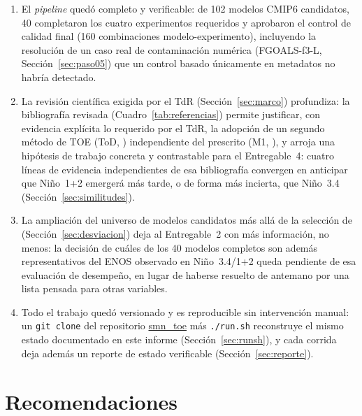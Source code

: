 \documentclass[11pt,a4paper]{article}
\newcommand{\archivo}[1]{\begingroup\hypersetup{urlcolor=black}\url{#1}\endgroup}
\begin{document}
\begin{enumerate}[label=(\roman*)]

\item El \emph{pipeline} qued\'o completo y verificable: de 102 modelos CMIP6 candidatos, 40 completaron los cuatro experimentos requeridos y aprobaron el control de calidad final (160 combinaciones modelo-experimento), incluyendo la resoluci\'on de un caso real de contaminaci\'on num\'erica (FGOALS-f3-L, Secci\'on~\ref{sec:paso05}) que un control basado \'unicamente en metadatos no habr\'ia detectado.

\item La revisi\'on cient\'ifica exigida por el TdR (Secci\'on~\ref{sec:marco}) profundiza: la bibliograf\'ia revisada (Cuadro~\ref{tab:referencias}) permite justificar, con evidencia expl\'icita lo requerido por el TdR, la adopci\'on de un segundo m\'etodo de TOE (ToD, \citealp{gopika2024}) independiente del prescrito (M1, \citealp{szabo2016}), y arroja una hip\'otesis de trabajo concreta y contrastable para el Entregable~4: cuatro l\'ineas de evidencia independientes de esa bibliograf\'ia convergen en anticipar que Ni\~no~1+2 emerger\'a m\'as tarde, o de forma m\'as incierta, que Ni\~no~3.4 (Secci\'on~\ref{sec:similitudes}).

\item La ampliaci\'on del universo de modelos candidatos m\'as all\'a de la selecci\'on de \citet{bruno2023} (Secci\'on~\ref{sec:desviacion}) deja al Entregable~2 con m\'as informaci\'on, no menos: la decisi\'on de cu\'ales de los 40 modelos completos son adem\'as representativos del ENOS observado en Ni\~no~3.4/1+2 queda pendiente de esa evaluaci\'on de desempe\~no, en lugar de haberse resuelto de antemano por una lista pensada para otras variables.

\item Todo el trabajo qued\'o versionado y es reproducible sin intervenci\'on manual: un \texttt{git clone} del repositorio \archivo{smn_toe} m\'as \texttt{./run.sh} reconstruye el mismo estado documentado en este informe (Secci\'on~\ref{sec:runsh}), y cada corrida deja adem\'as un reporte de estado verificable (Secci\'on~\ref{sec:reporte}).
\end{enumerate}

\section{Recomendaciones}
\label{sec:recomendaciones}
\end{document}
